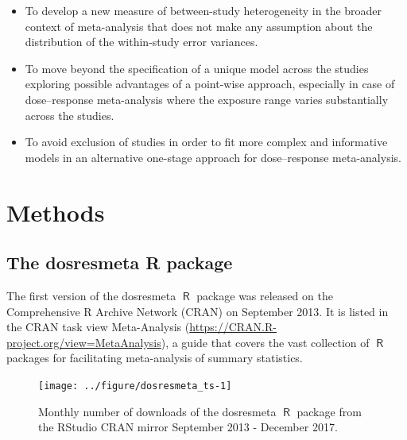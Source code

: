 \documentclass[11pt,a4paper,twoside,openany]{book}\usepackage{knitr}
\newcommand{\pkg}[1]{{\fontseries{b}\selectfont #1}}
\DeclareMathOperator{\R}{\textsf{R}}
\begin{document}
{{\begin{itemize}
\item To develop a new measure of between-study heterogeneity in the broader context of meta-analysis that does not make any assumption about the distribution of the within-study error variances.

\item To move beyond the specification of a unique model across the studies exploring possible advantages of a point-wise approach, especially in case of dose--response meta-analysis where the exposure range varies substantially across the studies.

\item To avoid exclusion of studies in order to fit more complex and informative models in an alternative one-stage approach for dose--response meta-analysis.

\end{itemize}


%

\chapter{Methods}

\section{The \pkg{dosresmeta} \textsf{R} package}

The first version of the \pkg{dosresmeta} $\R$ package was released on the Comprehensive R Archive Network (CRAN) on September 2013. It is listed in the CRAN task view Meta-Analysis (\url{https://CRAN.R-project.org/view=MetaAnalysis}), a guide that covers the vast collection of $\R$ packages for facilitating meta-analysis of summary statistics.

\begin{knitrout}\footnotesize
{}\color{fgcolor}\begin{figure}[ht!]

{\centering \texttt{[image: ../figure/dosresmeta\_ts-1]} 

}

\caption[Monthly number of downloads of the \pkg{dosresmeta} $\R$ package from the RStudio CRAN mirror September 2013 - December 2017]{Monthly number of downloads of the \pkg{dosresmeta} $\R$ package from the RStudio CRAN mirror September 2013 - December 2017.}\label{fig:dosresmeta_ts}
\end{figure}



\end{knitrout}}}
\end{document}

